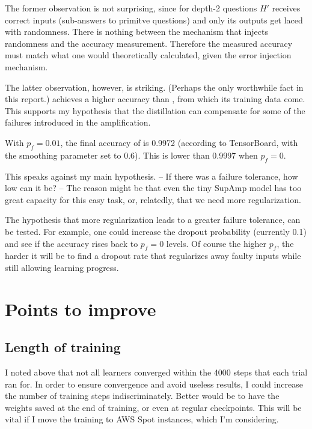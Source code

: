 \documentclass{farlamp}
\begin{document}
\Disc The former observation is not surprising, since for depth-2 questions $H'$
receives correct inputs (sub-answers to primitve questions) and only its outputs
get laced with randomness. There is nothing between the mechanism that injects
randomness and the accuracy measurement. Therefore the measured accuracy must
match what one would theoretically calculated, given the error injection
mechanism.

The latter observation, however, is striking. (Perhaps the only worthwhile fact
in this report.) \Xpa achieves a higher accuracy than \AmpHp, from which its
training data come. This supports my hypothesis that the distillation can
compensate for some of the failures introduced in the amplification.


\Obs With $p_f = 0.01$, the final accuracy of \Xpa is 0.9972 (according to
TensorBoard, with the smoothing parameter set to 0.6). This is lower than 0.9997
when $p_f = 0$.

\Disc This speaks against my main hypothesis. – If there was a failure
tolerance, how low can it be? – The reason might be that even the tiny SupAmp
model has too great capacity for this easy task, or, relatedly, that we need
more regularization.

The hypothesis that more regularization leads to a greater failure tolerance,
can be tested. \TODO For example, one could increase the dropout probability
(currently 0.1) and see if the accuracy rises back to $p_f = 0$ levels. Of
course the higher $p_f$, the harder it will be to find a dropout rate that
regularizes away faulty inputs while still allowing learning progress.


\section{Points to improve}

\subsection{Length of training}

I noted above that not all learners converged within the 4000 steps that each
trial ran for. In order to ensure convergence and avoid useless results, I could
increase the number of training steps indiscriminately. Better would be to have
the weights saved at the end of training, or even at regular checkpoints. This
will be vital if I move the training to AWS Spot instances, which I'm
considering.
\end{document}
